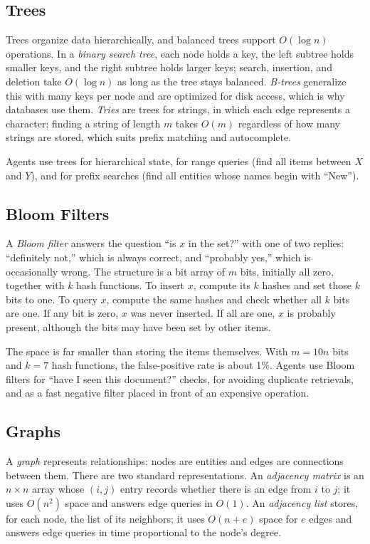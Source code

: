\documentclass[11pt]{book}
\begin{document}
\subsection{Trees}

Trees organize data hierarchically, and balanced trees support $O(\log n)$ operations. In a \emph{binary search tree}, each node holds a key, the left subtree holds smaller keys, and the right subtree holds larger keys; search, insertion, and deletion take $O(\log n)$ as long as the tree stays balanced. \emph{B-trees} generalize this with many keys per node and are optimized for disk access, which is why databases use them. \emph{Tries} are trees for strings, in which each edge represents a character; finding a string of length $m$ takes $O(m)$ regardless of how many strings are stored, which suits prefix matching and autocomplete.

Agents use trees for hierarchical state, for range queries (find all items between $X$ and $Y$), and for prefix searches (find all entities whose names begin with ``New'').

\subsection{Bloom Filters}

A \emph{Bloom filter} answers the question ``is $x$ in the set?'' with one of two replies: ``definitely not,'' which is always correct, and ``probably yes,'' which is occasionally wrong. The structure is a bit array of $m$ bits, initially all zero, together with $k$ hash functions. To insert $x$, compute its $k$ hashes and set those $k$ bits to one. To query $x$, compute the same hashes and check whether all $k$ bits are one. If any bit is zero, $x$ was never inserted. If all are one, $x$ is probably present, although the bits may have been set by other items.

The space is far smaller than storing the items themselves. With $m = 10n$ bits and $k = 7$ hash functions, the false-positive rate is about 1\%. Agents use Bloom filters for ``have I seen this document?'' checks, for avoiding duplicate retrievals, and as a fast negative filter placed in front of an expensive operation.

\subsection{Graphs}

A \emph{graph} represents relationships: nodes are entities and edges are connections between them. There are two standard representations. An \emph{adjacency matrix} is an $n \times n$ array whose $(i,j)$ entry records whether there is an edge from $i$ to $j$; it uses $O(n^2)$ space and answers edge queries in $O(1)$. An \emph{adjacency list} stores, for each node, the list of its neighbors; it uses $O(n + e)$ space for $e$ edges and answers edge queries in time proportional to the node's degree.
\end{document}
